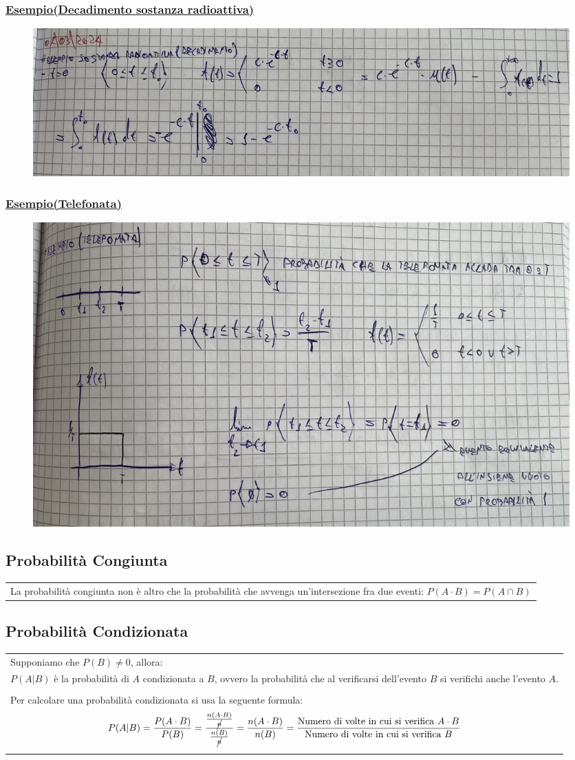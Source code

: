 \documentclass{article}
\begin{document}
\subsubsection{\underline{Esempio(Decadimento sostanza radioattiva)}}
\begin{figure}[ht]
\centering
\includegraphics[scale=0.13]{ese/3.jpeg} 
\end{figure}
\newpage
\subsubsection{\underline{Esempio(Telefonata)}}
\begin{figure}[ht]
\centering
\includegraphics[scale=0.13]{ese/4.jpeg} 
\end{figure}

\subsection{Probabilità Congiunta}
\begin{tabular}{|p{13cm}}
La probabilità congiunta non è altro che la probabilità che avvenga un’intersezione fra due eventi: $P(A \cdot B) = P(A \cap B)$
\end{tabular}

\subsection{Probabilità Condizionata}
\begin{tabular}{|p{13cm}}
Supponiamo che $P(B)\neq0$, allora: \\
$P( A| B) $ è la probabilità di $A$ condizionata a $B$, ovvero la probabilità che al
verificarsi dell'evento $B$ si verifichi anche l'evento $A$. \\ \\
Per calcolare una probabilità condizionata si usa la seguente formula:
\[P(A|B) = \frac{P(A \cdot B)}{P(B)} = \frac{\frac{n(A \cdot B)}{\cancel n}}{\frac{n(B)}{\cancel n}} = \frac{n(A \cdot B)}{n(B)} = \frac{\text{Numero di volte in cui si verifica } A\cdot B}{\text{Numero di volte in cui si verifica } B}\]
\end{tabular}
\end{document}
